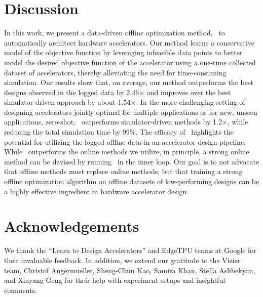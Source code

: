 \section{Discussion}
\label{sec:discussion}
\vspace{-0.1cm}
%
In this work, we present a data-driven offline optimization method, \primemethodname\ to automatically architect hardware accelerators. Our method learns a conservative model of the objective function by leveraging  infeasible data points to better model the desired objective function of the accelerator using a one-time collected dataset of accelerators, thereby alleviating the need for time-consuming simulation.
%
Our results show that, on average, our method outperforms the best designs observed in the logged data by 2.46$\times$ and improves over the best simulator-driven approach by about 1.54$\times$. 
%
In the more challenging setting of designing accelerators jointly optimal for multiple applications or for new, unseen applications, zero-shot, \primemethodname\ outperforms simulator-driven methods by 1.2$\times$, while reducing the total simulation time by 99\%.
%
{The efficacy of \primemethodname\ highlights the potential for utilizing the logged offline data in an accelerator design pipeline. While \primemethodname\ outperforms the online methods we utilize, in principle, a strong online method can be devised by running \primemethodname\ in the inner loop. Our goal is to not advocate that offline methods must replace online methods, but that training a strong offline optimization algorithm on offline datasets of low-performing designs can be a highly effective ingredient in hardware accelerator design.}


\section*{Acknowledgements}
%
We thank the ``Learn to Design Accelerators'' and EdgeTPU teams at Google for their invaluable feedback.
%
In addition, we extend our gratitude to the Vizier team, Christof Angermueller, Sheng-Chun Kao, Samira Khan, Stella Aslibekyan, and Xinyang Geng for their help with experiment setups and insightful comments. 